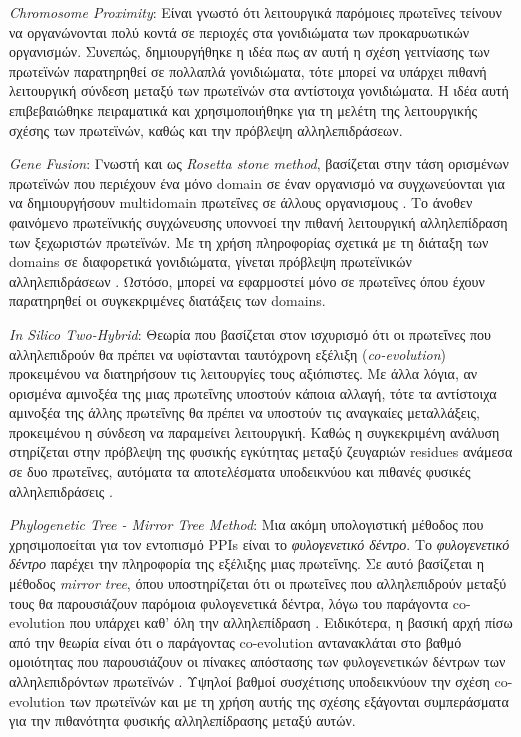 \smallskip
\textit{Chromosome Proximity}: Είναι γνωστό ότι λειτουργικά παρόμοιες πρωτεΐνες τείνουν να οργανώνονται πολύ κοντά σε περιοχές στα γονιδιώματα των προκαρυωτικών οργανισμών. Συνεπώς, δημιουργήθηκε η ιδέα πως αν αυτή η σχέση γειτνίασης των πρωτεϊνών παρατηρηθεί σε πολλαπλά γονιδιώματα, τότε μπορεί να υπάρχει πιθανή λειτουργική σύνδεση μεταξύ των πρωτεϊνών στα αντίστοιχα γονιδιώματα. Η ιδέα αυτή επιβεβαιώθηκε πειραματικά \cite{Yamada2003} και χρησιμοποιήθηκε για τη μελέτη της λειτουργικής σχέσης των πρωτεϊνών, καθώς και την πρόβλεψη αλληλεπιδράσεων.

\smallskip
\textit{Gene Fusion}: Γνωστή και ως \textit{Rosetta stone method}, βασίζεται στην τάση ορισμένων πρωτεϊνών που περιέχουν ένα μόνο domain σε έναν οργανισμό να συγχωνεύονται για να δημιουργήσουν multidomain πρωτεΐνες σε άλλους οργανισμους \cite{Enright1999}. Το άνοθεν φαινόμενο πρωτεϊνικής συγχώνευσης υποννοεί την πιθανή λειτουργική αλληλεπίδραση των ξεχωριστών πρωτεϊνών. Με τη χρήση πληροφορίας σχετικά με τη διάταξη των domains σε διαφορετικά γονιδιώματα, γίνεται πρόβλεψη πρωτεϊνικών αλληλεπιδράσεων \cite{Marcotte1999}. Ωστόσο, μπορεί να εφαρμοστεί μόνο σε πρωτεΐνες όπου έχουν παρατηρηθεί οι συγκεκριμένες διατάξεις των domains.

\smallskip
\textit{In Silico Two-Hybrid}: Θεωρία που βασίζεται στον ισχυρισμό ότι οι πρωτεΐνες που αλληλεπιδρούν θα πρέπει να υφίστανται ταυτόχρονη εξέλιξη (\textit{co-evolution}) προκειμένου να διατηρήσουν τις λειτουργίες τους αξιόπιστες. Με άλλα λόγια, αν ορισμένα αμινοξέα της μιας πρωτεΐνης υποστούν κάποια αλλαγή, τότε τα αντίστοιχα αμινοξέα της άλλης πρωτεΐνης θα πρέπει να υποστούν τις αναγκαίες μεταλλάξεις, προκειμένου η σύνδεση να παραμείνει λειτουργική. Καθώς η συγκεκριμένη ανάλυση στηρίζεται στην πρόβλεψη της φυσικής εγκύτητας μεταξύ ζευγαριών residues ανάμεσα σε δυο πρωτεΐνες, αυτόματα τα αποτελέσματα υποδεικνύου και πιθανές φυσικές αλληλεπιδράσεις \cite{Pazos2002}.

\smallskip
\textit{Phylogenetic Tree - Mirror Tree Method}: Μια ακόμη υπολογιστική μέθοδος που χρησιμοποείται για τον εντοπισμό PPIs είναι το \textit{φυλογενετικό δέντρο}. Το \textit{φυλογενετικό δέντρο} παρέχει την πληροφορία της εξέλιξης μιας πρωτεΐνης. Σε αυτό βασίζεται η μέθοδος \textit{mirror tree}, όπου υποστηρίζεται ότι οι πρωτεΐνες που αλληλεπιδρούν μεταξύ τους θα παρουσιάζουν παρόμοια φυλογενετικά δέντρα, λόγω του παράγοντα co-evolution που υπάρχει καθ' όλη την αλληλεπίδραση \cite{Sato2005}. Ειδικότερα, η βασική αρχή πίσω από την θεωρία είναι ότι ο παράγοντας co-evolution αντανακλάται στο βαθμό ομοιότητας που παρουσιάζουν οι πίνακες απόστασης των φυλογενετικών δέντρων των αλληλεπιδρόντων πρωτεϊνών \cite{Craig2007}. Υψηλοί βαθμοί συσχέτισης υποδεικνύουν την σχέση co-evolution των πρωτεϊνών και με τη χρήση αυτής της σχέσης εξάγονται συμπεράσματα για την πιθανότητα φυσικής αλληλεπίδρασης μεταξύ αυτών.


